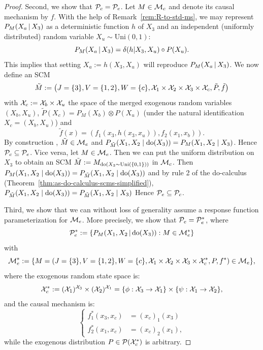 \begin{proof}
  Second, we show that $\mathcal{P}_c = \mathcal{P}_e$.
  Let $M \in \mathcal{M}_c$ and denote its causal mechanism by $f$.
  With the help of Remark~\ref{rem:R-to-std-ms}, we may represent $P_M(X_a \operatorname*{|} X_3)$ as a deterministic function $h$ of $X_3$ and an independent (uniformly distributed) random variable $X_u \sim \mathrm{Uni}(0,1)$:
  $$P_M(X_a \operatorname*{|} X_3) = \delta(h|X_3,X_u) \circ P(X_u).$$
  This implies that setting $X_a := h(X_3,X_u)$ will reproduce $P_M(X_a \operatorname*{|} X_3)$.
  We now define an SCM
  $$\tilde{M} := \left ( J=\{3\}, V=\{1,2\}, W=\{c\}, \mathcal{X}_1 \times \mathcal{X}_2 \times \mathcal{X}_3 \times \mathcal{X}_{c}, \tilde{P}, \tilde{f} \right )$$
  with $\mathcal{X}_c := \mathcal{X}_b \times \mathcal{X}_u$ the space of the merged exogenous random variables $(X_b,X_u)$,
  $\tilde{P}(X_c) = P_M(X_b) \otimes P(X_u)$ (under the natural identification $X_c = (X_b,X_u)$) and
  $$\tilde{f}(x) = (f_1(x_3,h(x_3,x_u)),f_2(x_1,x_b)).$$
  By construction , $\tilde{M} \in \mathcal{M}_e$ and $P_{\tilde{M}}(X_1,X_2 \mid \operatorname{do}(X_3)) = P_M(X_1,X_2 \mid X_3)$.
  Hence $\mathcal{P}_c \subseteq \mathcal{P}_e$.
  Vice versa, let $M \in \mathcal{M}_e$.
  Then we can put the uniform distribution on $X_3$ to obtain an SCM $\tilde{M} := M_{\operatorname{do}(X_3 \sim \mathrm{Uni}(\{0,1\}))}$ in $\mathcal{M}_c$.
  Then $P_M(X_1,X_2 \mid \operatorname{do}(X_3)) = P_{\tilde{M}}(X_1,X_2 \mid \operatorname{do}(X_3))$ and
  by rule 2 of the do-calculus (Theorem~\ref{thm:as-do-calculus-scms-simplified}),
  $P_{\tilde{M}}(X_1,X_2 \mid \operatorname{do}(X_3)) = P_{\tilde{M}}(X_1,X_2 \mid X_3)$
  Hence $\mathcal{P}_e \subseteq \mathcal{P}_c$.

  Third, we show that we can without loss of generality assume a response function parameterization for $\mathcal{M}_e$.
  More precisely, we show that $\mathcal{P}_e = \mathcal{P}_e^*$, where
  $$\mathcal{P}_e^* := \{ P_M(X_1, X_2 \operatorname*{|} \operatorname{do}(X_3)) : M \in \mathcal{M}_e^* \}$$
  with
  $$\mathcal{M}_e^* := \{ M = \left ( J=\{3\}, V=\{1,2\}, W=\{c\}, \mathcal{X}_1 \times \mathcal{X}_2 \times \mathcal{X}_3 \times \mathcal{X}_{c}^*, P, f^* \right ) \in \mathcal{M}_e \},$$
  where the exogenous random state space is:
  $$\mathcal{X}_{c}^* := (\mathcal{X}_1)^{\mathcal{X}_3} \times (\mathcal{X}_2)^{\mathcal{X}_1} = \{\phi : \mathcal{X}_3 \to \mathcal{X}_1\} \times \{\psi : \mathcal{X}_1 \to \mathcal{X}_2\},$$
  and the causal mechanism is:
  $$\begin{cases}
    f^*_1(x_3,x_c) &= (x_c)_1(x_3) \\
    f^*_2(x_1,x_c) &= (x_c)_2(x_1),
  \end{cases}$$
  while the exogenous distribution $P \in \mathcal{P}(\mathcal{X}_{c}^*)$ is arbitrary.
  

\end{proof}
